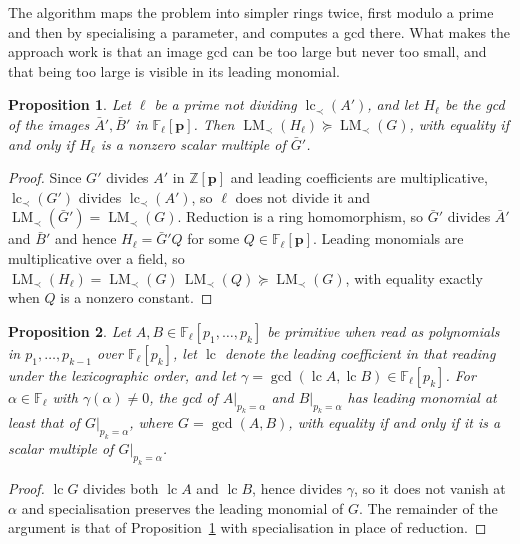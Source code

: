 \documentclass[11pt,a4paper]{article}
\theoremstyle{plain}
\newtheorem{proposition}{Proposition}
\theoremstyle{definition}
\theoremstyle{remark}
\newcommand{\FF}{\mathbb{F}}
\newcommand{\bp}{\boldsymbol{p}}
\newcommand{\LM}{\operatorname{LM}}
\begin{document}
The algorithm maps the problem into simpler rings twice, first modulo a prime and then by specialising
a parameter, and computes a gcd there. What makes the approach work is that an image gcd can be too
large but never too small, and that being too large is visible in its leading monomial.

\begin{proposition}
\label{prop:prime-image}
Let $\ell$ be a prime not dividing $\operatorname{lc}_\prec(A')$, and let $H_\ell$ be the gcd of the
images $\bar A', \bar B'$ in $\FF_\ell[\bp]$. Then $\LM_\prec(H_\ell) \succeq \LM_\prec(G)$, with
equality if and only if $H_\ell$ is a nonzero scalar multiple of $\bar G'$.
\end{proposition}

\begin{proof}
Since $G'$ divides $A'$ in $\mathbb{Z}[\bp]$ and leading coefficients are multiplicative,
$\operatorname{lc}_\prec(G')$ divides $\operatorname{lc}_\prec(A')$, so $\ell$ does not divide it and
$\LM_\prec(\bar G') = \LM_\prec(G)$. Reduction is a ring homomorphism, so $\bar G'$ divides $\bar A'$
and $\bar B'$ and hence $H_\ell = \bar G' Q$ for some $Q \in \FF_\ell[\bp]$. Leading monomials are
multiplicative over a field, so $\LM_\prec(H_\ell) = \LM_\prec(G)\,\LM_\prec(Q) \succeq \LM_\prec(G)$,
with equality exactly when $Q$ is a nonzero constant.
\end{proof}

\begin{proposition}
\label{prop:point-image}
Let $A, B \in \FF_\ell[p_1,\dots,p_k]$ be primitive when read as polynomials in $p_1,\dots,p_{k-1}$
over $\FF_\ell[p_k]$, let $\operatorname{lc}$ denote the leading coefficient in that reading under
the lexicographic order, and let $\gamma = \gcd(\operatorname{lc} A, \operatorname{lc} B) \in
\FF_\ell[p_k]$. For $\alpha \in \FF_\ell$ with $\gamma(\alpha) \neq 0$, the gcd of $A|_{p_k=\alpha}$
and $B|_{p_k=\alpha}$ has leading monomial at least that of $G|_{p_k = \alpha}$, where $G = \gcd(A,B)$,
with equality if and only if it is a scalar multiple of $G|_{p_k=\alpha}$.
\end{proposition}

\begin{proof}
$\operatorname{lc} G$ divides both $\operatorname{lc} A$ and $\operatorname{lc} B$, hence divides
$\gamma$, so it does not vanish at $\alpha$ and specialisation preserves the leading monomial of $G$.
The remainder of the argument is that of Proposition~\ref{prop:prime-image} with specialisation in
place of reduction.
\end{proof}
\end{document}
